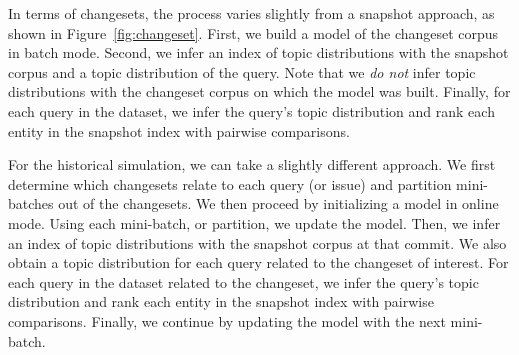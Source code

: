 In terms of changesets, the process varies slightly from a snapshot approach, as
shown in Figure~\ref{fig:changeset}.  First, we build a model of the changeset
corpus in batch mode.  Second, we infer an index of topic distributions with the
snapshot corpus and a topic distribution of the query.  Note that we \emph{do
not} infer topic distributions with the changeset corpus on which the model was
built.  Finally, for each query in the dataset, we infer the query's topic
distribution and rank each entity in the snapshot index with pairwise
comparisons.

For the historical simulation, we can take a slightly different approach.  We
first determine which changesets relate to each query (or issue) and partition
mini-batches out of the changesets.  We then proceed by initializing a model in
online mode.  Using each mini-batch, or partition, we update the model.  Then,
we infer an index of topic distributions with the snapshot corpus at that
commit.  We also obtain a topic distribution for each query related to the
changeset of interest.  For each query in the dataset related to the changeset,
we infer the query's topic distribution and rank each entity in the snapshot
index with pairwise comparisons. Finally, we continue by updating the model with
the next mini-batch.

